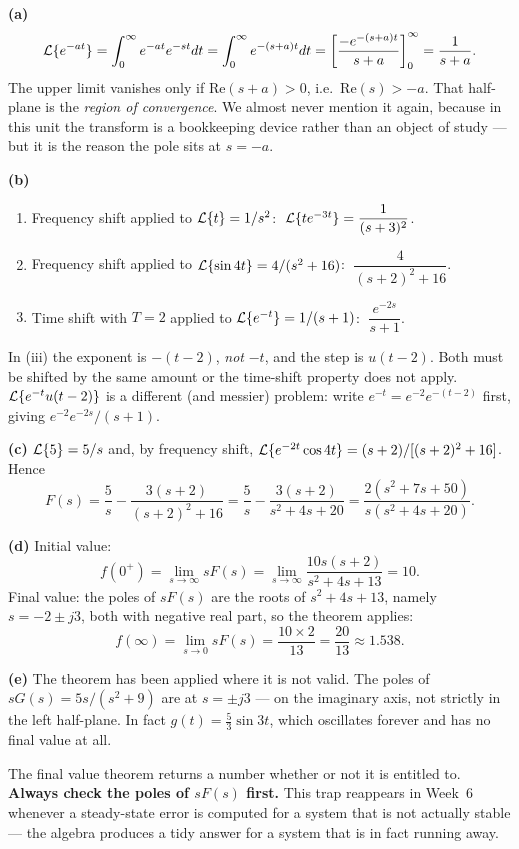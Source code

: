 \documentclass[11pt,a4paper]{article}
\begin{document}
\begin{solution}
\textbf{(a)}
\[
  \mathcal{L}\{e^{-at}\}=\int_{0}^{\infty}e^{-at}e^{-st}dt
  =\int_{0}^{\infty}e^{-(s+a)t}dt
  =\left[\frac{-e^{-(s+a)t}}{s+a}\right]_{0}^{\infty}
  =\frac{1}{s+a}.
\]
The upper limit vanishes only if $\mathrm{Re}(s+a)>0$, i.e.\
$\mathrm{Re}(s)>-a$. That half-plane is the \emph{region of convergence}. We
almost never mention it again, because in this unit the transform is a
bookkeeping device rather than an object of study --- but it is the reason the
pole sits at $s=-a$.

\medskip
\textbf{(b)}
\begin{enumerate}[label=(\roman*)]
\item Frequency shift applied to $\mathcal{L}\{t\}=1/s^{2}$:
      $\;\mathcal{L}\{t e^{-3t}\}=\dfrac{1}{(s+3)^{2}}$.
\item Frequency shift applied to $\mathcal{L}\{\sin 4t\}=4/(s^{2}+16)$:
      $\;\dfrac{4}{(s+2)^{2}+16}$.
\item Time shift with $T=2$ applied to $\mathcal{L}\{e^{-t}\}=1/(s+1)$:
      $\;\dfrac{e^{-2s}}{s+1}$.
\end{enumerate}

\begin{pitfall}
In (iii) the exponent is $-(t-2)$, \emph{not} $-t$, and the step is
$u(t-2)$. Both must be shifted by the same amount or the time-shift property
does not apply. $\mathcal{L}\{e^{-t}u(t-2)\}$ is a different (and messier) problem:
write $e^{-t}=e^{-2}e^{-(t-2)}$ first, giving $e^{-2}e^{-2s}/(s+1)$.
\end{pitfall}

\medskip
\textbf{(c)} $\mathcal{L}\{5\}=5/s$ and, by frequency shift,
$\mathcal{L}\{e^{-2t}\cos 4t\}=(s+2)/[(s+2)^{2}+16]$. Hence
\[
  F(s)=\frac{5}{s}-\frac{3(s+2)}{(s+2)^{2}+16}
      =\frac{5}{s}-\frac{3(s+2)}{s^{2}+4s+20}
      =\frac{2(s^{2}+7s+50)}{s(s^{2}+4s+20)} .
\]

\medskip
\textbf{(d)} Initial value:
\[
  f(0^{+})=\lim_{s\to\infty}sF(s)
   =\lim_{s\to\infty}\frac{10s(s+2)}{s^{2}+4s+13}=10 .
\]
Final value: the poles of $sF(s)$ are the roots of $s^{2}+4s+13$, namely
$s=-2\pm j3$, both with negative real part, so the theorem applies:
\[
  f(\infty)=\lim_{s\to 0}sF(s)=\frac{10\times 2}{13}=\frac{20}{13}\approx 1.538 .
\]

\medskip
\textbf{(e)} The theorem has been applied where it is not valid. The poles of
$sG(s)=5s/(s^{2}+9)$ are at $s=\pm j3$ --- on the imaginary axis, not strictly
in the left half-plane. In fact $g(t)=\tfrac{5}{3}\sin 3t$, which oscillates
forever and has no final value at all.

\begin{pitfall}
The final value theorem returns a number whether or not it is entitled to.
\textbf{Always check the poles of $sF(s)$ first.} This trap reappears in Week~6
whenever a steady-state error is computed for a system that is not actually
stable --- the algebra produces a tidy answer for a system that is in fact
running away.
\end{pitfall}
\end{solution}
\end{document}

